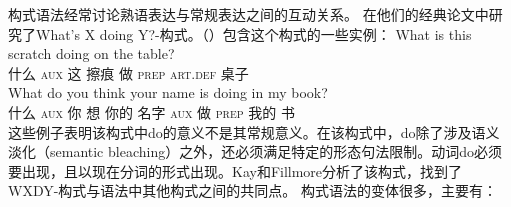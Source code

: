 构式语法经常讨论熟语表达与常规表达之间的互动关系。 \citet{KF99a}在他们的经典论文中研究了What's X doing Y?-构式。（）包含这个构式的一些实例：
\eal
\ex 
\gll What is this scratch doing on the table?\\
      什么 \textsc{aux} 这 擦痕 做 \textsc{prep} \textsc{art}.\textsc{def} 桌子\\
\ex 
\gll What do you think your name is doing in my book?\\
      什么 \textsc{aux} 你 想 你的 名字 \textsc{aux} 做 \textsc{prep} 我的 书\\
\zl
这些例子表明该构式中do的意义不是其常规意义。在该构式中，do除了涉及语义淡化（semantic bleaching）之外，还必须满足特定的形态句法限制。动词do必须要出现，且以现在分词的形式出现。Kay和Fillmore分析了该构式，找到了WXDY-构式与语法中其他构式之间的共同点。
构式语法的变体很多，主要有：

